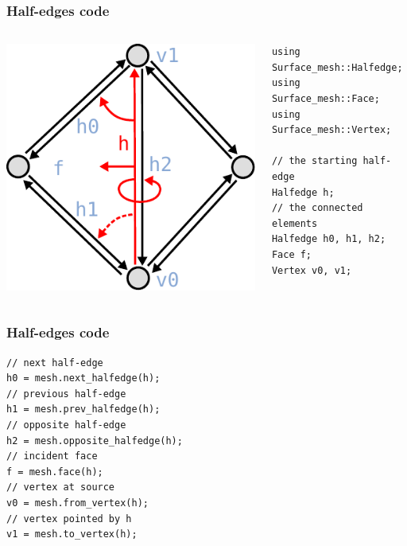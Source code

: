 \begin{frame}[fragile]
\frametitle{Half-edges code}
\begin{columns}[c]
  \begin{column}{0.4\textwidth}
\includegraphics[width=\textwidth]{figures/halfedge-queries}
  \end{column}
  \begin{column}{0.6\textwidth}
  \lstset{ 
  	numbers=none, 
  	xleftmargin=0cm, 
  	xrightmargin=0cm
  }
\begin{lstlisting}
using Surface_mesh::Halfedge;
using Surface_mesh::Face;
using Surface_mesh::Vertex;

// the starting half-edge
Halfedge h;
// the connected elements
Halfedge h0, h1, h2;
Face f;
Vertex v0, v1;
\end{lstlisting}
  \end{column}
\end{columns}
\end{frame}

\begin{frame}[fragile]
\frametitle{Half-edges code}
\lstset{ numbers=none }
\begin{lstlisting}
// next half-edge
h0 = mesh.next_halfedge(h);
// previous half-edge
h1 = mesh.prev_halfedge(h);
// opposite half-edge
h2 = mesh.opposite_halfedge(h);
// incident face
f = mesh.face(h);
// vertex at source
v0 = mesh.from_vertex(h);
// vertex pointed by h
v1 = mesh.to_vertex(h);
\end{lstlisting}
\end{frame}

